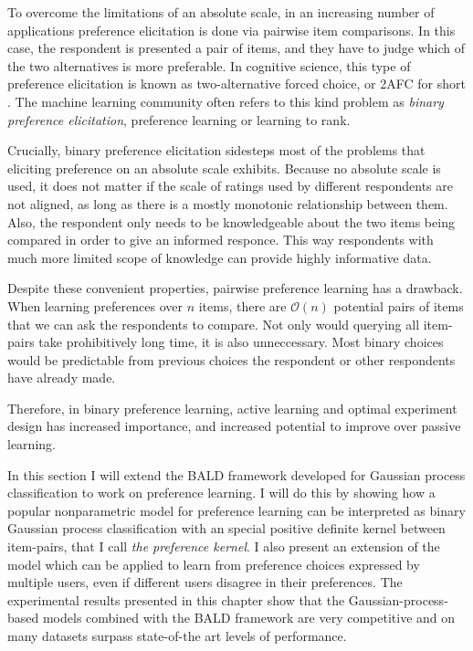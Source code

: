 To overcome the limitations of an absolute scale, in an increasing number of applications preference elicitation is done via pairwise item comparisons. In this case, the respondent is presented a pair of items, and they have to judge which of the two alternatives is more preferable. In cognitive science, this type of preference elicitation is known as two-alternative forced choice, or 2AFC for short \citep{2AFC}. The machine learning community often refers to this kind problem as \emph{binary preference elicitation}, preference learning or learning to rank.

Crucially, binary preference elicitation sidesteps most of the problems that eliciting preference on an absolute scale exhibits. Because no absolute scale is used, it does not matter if the scale of ratings used by different respondents are not aligned, as long as there is a mostly monotonic relationship between them. Also, the respondent only needs to be knowledgeable about the two items being compared in order to give an informed responce. This way respondents with much more limited scope of knowledge can provide highly informative data.

Despite these convenient properties, pairwise preference learning has a drawback. When learning preferences over $n$ items, there are $\mathcal{O}(n)$ potential pairs of items that we can ask the respondents to compare. Not only would querying all item-pairs take prohibitively long time, it is also unneccessary. Most binary choices would be predictable from previous choices the respondent or other respondents have already made.

Therefore, in binary preference learning, active learning and optimal experiment design has increased importance, and increased potential to improve over passive learning.

In this section I will extend the BALD framework developed for Gaussian process classification to work on preference learning. I will do this by showing how a popular nonparametric model for preference learning can be interpreted as binary Gaussian process classification with an special positive definite kernel between item-pairs, that I call \emph{the preference kernel}. I also present an extension of the model which can be applied to learn from preference choices expressed by multiple users, even if different users disagree in their preferences. The experimental results presented in this chapter show that the Gaussian-process-based models combined with the BALD framework are very competitive and on many datasets surpass state-of-the art levels of performance.

